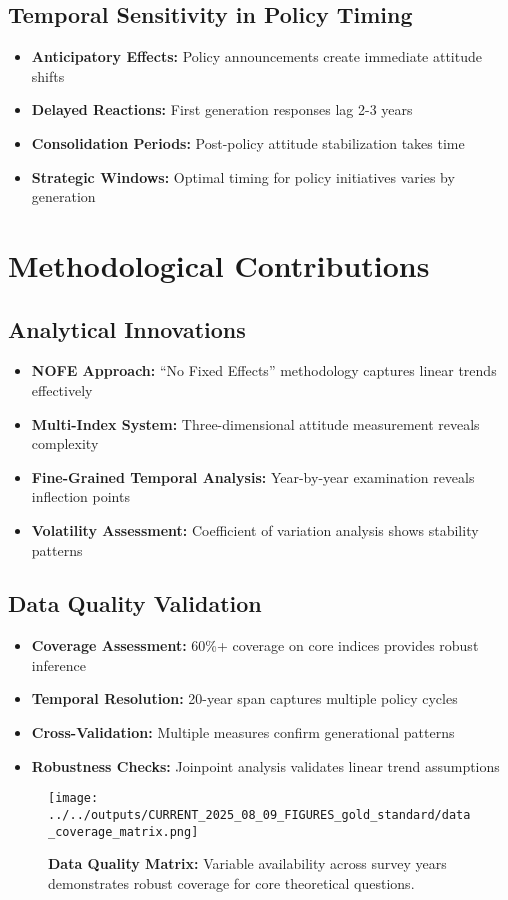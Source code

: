 \documentclass[11pt,letterpaper]{article}
\newcommand{\compactdesc}[2]{\item \textbf{#1:} #2}
\begin{document}
\subsection{Temporal Sensitivity in Policy Timing}
\begin{itemize}
    \compactdesc{Anticipatory Effects}{Policy announcements create immediate attitude shifts}
    \compactdesc{Delayed Reactions}{First generation responses lag 2-3 years}
    \compactdesc{Consolidation Periods}{Post-policy attitude stabilization takes time}
    \compactdesc{Strategic Windows}{Optimal timing for policy initiatives varies by generation}
\end{itemize}

\section{Methodological Contributions}

\subsection{Analytical Innovations}
\begin{itemize}
    \compactdesc{NOFE Approach}{``No Fixed Effects'' methodology captures linear trends effectively}
    \compactdesc{Multi-Index System}{Three-dimensional attitude measurement reveals complexity}
    \compactdesc{Fine-Grained Temporal Analysis}{Year-by-year examination reveals inflection points}
    \compactdesc{Volatility Assessment}{Coefficient of variation analysis shows stability patterns}
\end{itemize}

\subsection{Data Quality Validation}
\begin{itemize}
    \compactdesc{Coverage Assessment}{60\%+ coverage on core indices provides robust inference}
    \compactdesc{Temporal Resolution}{20-year span captures multiple policy cycles}
    \compactdesc{Cross-Validation}{Multiple measures confirm generational patterns}
    \compactdesc{Robustness Checks}{Joinpoint analysis validates linear trend assumptions}
\end{itemize}

\begin{figure}[H]
    \centering
    \texttt{[image: ../../outputs/CURRENT\_2025\_08\_09\_FIGURES\_gold\_standard/data\_coverage\_matrix.png]}
    \caption{\textbf{Data Quality Matrix:} Variable availability across survey years demonstrates robust coverage for core theoretical questions.}
    \label{fig:coverage}
\end{figure}
\end{document}
